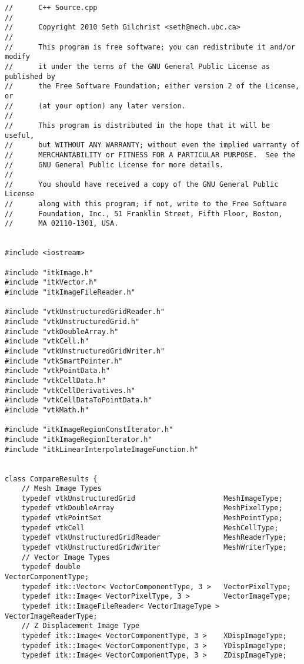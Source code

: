 \begin{lstlisting}
//      C++ Source.cpp
//      
//      Copyright 2010 Seth Gilchrist <seth@mech.ubc.ca>
//      
//      This program is free software; you can redistribute it and/or modify
//      it under the terms of the GNU General Public License as published by
//      the Free Software Foundation; either version 2 of the License, or
//      (at your option) any later version.
//      
//      This program is distributed in the hope that it will be useful,
//      but WITHOUT ANY WARRANTY; without even the implied warranty of
//      MERCHANTABILITY or FITNESS FOR A PARTICULAR PURPOSE.  See the
//      GNU General Public License for more details.
//      
//      You should have received a copy of the GNU General Public License
//      along with this program; if not, write to the Free Software
//      Foundation, Inc., 51 Franklin Street, Fifth Floor, Boston,
//      MA 02110-1301, USA.


#include <iostream>

#include "itkImage.h"
#include "itkVector.h"
#include "itkImageFileReader.h"

#include "vtkUnstructuredGridReader.h"
#include "vtkUnstructuredGrid.h"
#include "vtkDoubleArray.h"
#include "vtkCell.h"
#include "vtkUnstructuredGridWriter.h"
#include "vtkSmartPointer.h"
#include "vtkPointData.h"
#include "vtkCellData.h"
#include "vtkCellDerivatives.h"
#include "vtkCellDataToPointData.h"
#include "vtkMath.h"

#include "itkImageRegionConstIterator.h"
#include "itkImageRegionIterator.h"
#include "itkLinearInterpolateImageFunction.h"


class CompareResults {
	// Mesh Image Types
	typedef vtkUnstructuredGrid						MeshImageType;
	typedef vtkDoubleArray							MeshPixelType;
	typedef vtkPointSet								MeshPointType;
	typedef vtkCell									MeshCellType;
	typedef vtkUnstructuredGridReader				MeshReaderType;
	typedef vtkUnstructuredGridWriter				MeshWriterType;
	// Vector Image Types
	typedef double									VectorComponentType;
	typedef itk::Vector< VectorComponentType, 3 >	VectorPixelType;
	typedef itk::Image< VectorPixelType, 3 >		VectorImageType;
	typedef	itk::ImageFileReader< VectorImageType >	VectorImageReaderType;
	// Z Displacement Image Type
	typedef itk::Image< VectorComponentType, 3 >	XDispImageType;
	typedef itk::Image< VectorComponentType, 3 >	YDispImageType;	
	typedef itk::Image< VectorComponentType, 3 >	ZDispImageType;

	
	

\end{lstlisting}
